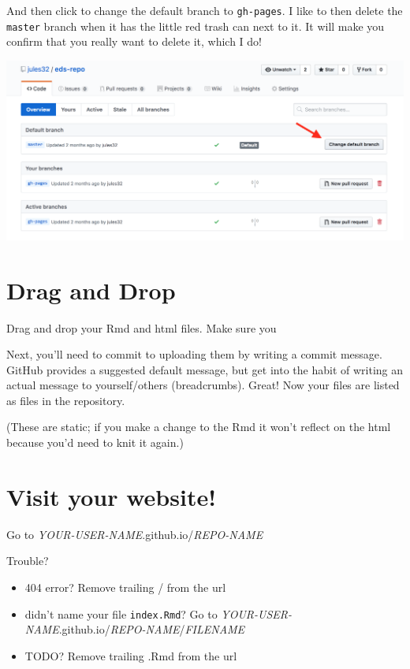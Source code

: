 \documentclass[]{book}
\providecommand{\tightlist}{%
  \setlength{\itemsep}{0pt}\setlength{\parskip}{0pt}}
\begin{document}
And then click to change the default branch to \texttt{gh-pages}. I like to then delete the \texttt{master} branch when it has the little red trash can next to it. It will make you confirm that you really want to delete it, which I do!

\includegraphics[width=0.8\linewidth]{img/github-change-branch}

\hypertarget{drag-and-drop}{%
\section{Drag and Drop}\label{drag-and-drop}}

Drag and drop your Rmd and html files. Make sure you

Next, you'll need to commit to uploading them by writing a commit message. GitHub provides a suggested default message, but get into the habit of writing an actual message to yourself/others (breadcrumbs). Great! Now your files are listed as files in the repository.

(These are static; if you make a change to the Rmd it won't reflect on the html because you'd need to knit it again.)

\hypertarget{visit-your-website}{%
\section{Visit your website!}\label{visit-your-website}}

Go to \emph{YOUR-USER-NAME}.github.io/\emph{REPO-NAME}

Trouble?

\begin{itemize}
\tightlist
\item
  404 error? Remove trailing / from the url
\item
  didn't name your file \texttt{index.Rmd}? Go to \emph{YOUR-USER-NAME}.github.io/\emph{REPO-NAME}/\emph{FILENAME}
\item
  TODO? Remove trailing .Rmd from the url
\end{itemize}
\end{document}
